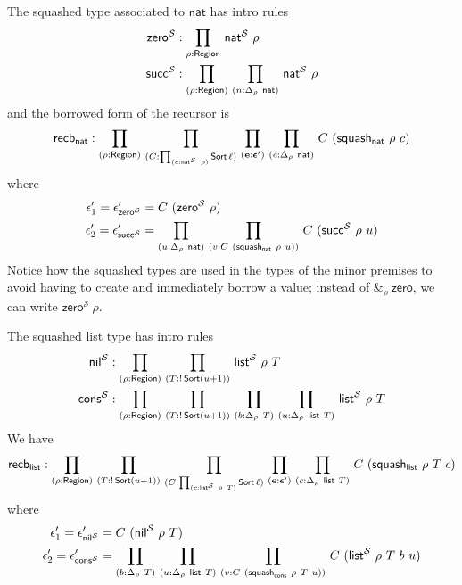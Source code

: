 \begin{eg}
	The squashed type associated to \( \mathsf{nat} \) has intro rules
	\begin{align*}
		\mathsf{zero}^{\mathcal S} &: \prd{\rho:\Region} \mathsf{nat}^{\mathcal S}\ \rho \\
		\mathsf{succ}^{\mathcal S} &: \prd{\rho:\Region}{n:\Delta_\rho\ \mathsf{nat}} \mathsf{nat}^{\mathcal S}\ \rho
	\end{align*}
	and the borrowed form of the recursor is
	\[ \mathsf{recb}_{\mathsf{nat}} : \prd{\rho:\Region}{C:\prd{c:\mathsf{nat}^{\mathcal S}\ \rho}\Sort \ell}{\vb e : \bm \epsilon'}{c:\Delta_\rho\ \mathsf{nat}}C\ (\mathsf{squash_{\mathsf{nat}}}\ \rho\ c) \]
	where
	\begin{align*}
		\epsilon_1' = \epsilon_{\mathsf{zero}^{\mathcal S}}' &= C\ (\mathsf{zero}^{\mathcal S}\ \rho) \\
		\epsilon_2' = \epsilon_{\mathsf{succ}^{\mathcal S}}' &= \prd{u:\Delta_\rho\ \mathsf{nat}}{v:C\ (\mathsf{squash_{\mathsf{nat}}}\ \rho\ u)} C\ (\mathsf{succ}^{\mathcal S}\ \rho\ u)
	\end{align*}
	Notice how the squashed types are used in the types of the minor premises to avoid having to create and immediately borrow a value; instead of \( \&_\rho\ \mathsf{zero} \), we can write \( \mathsf{zero}^{\mathcal S}\ \rho \).
\end{eg}
\begin{eg}[lists]
	The squashed list type has intro rules
	\begin{align*}
		\mathsf{nil}^{\mathcal S} &: \prd{\rho:\Region}{T:!\Sort(u+1)} \mathsf{list}^{\mathcal S}\ \rho\ T \\
		\mathsf{cons}^{\mathcal S} &: \prd{\rho:\Region}{T:!\Sort(u+1)}{b:\Delta_\rho\ T}{u:\Delta_\rho\ \mathsf{list}\ T} \mathsf{list}^{\mathcal S}\ \rho\ T
	\end{align*}
	We have
	\[ \mathsf{recb}_{\mathsf{list}} : \prd{\rho:\Region}{T:!\Sort(u+1)}{C:\prd{c:\mathsf{list}^{\mathcal S}\ \rho\ T}\Sort \ell}{\vb e : \bm \epsilon'}{c:\Delta_\rho\ \mathsf{list}\ T} C\ (\mathsf{squash_{\mathsf{list}}}\ \rho\ T\ c) \]
	where
	\begin{align*}
		\epsilon_1' = \epsilon_{\mathsf{nil}^{\mathcal S}}' &= C\ (\mathsf{nil}^{\mathcal S}\ \rho\ T) \\
		\epsilon_2' = \epsilon_{\mathsf{cons}^{\mathcal S}}' &= \prd{b:\Delta_\rho\ T}{u:\Delta_\rho\ \mathsf{list}\ T}{v:C\ (\mathsf{squash}_{\mathsf{cons}}\ \rho\ T\ u)} C\ (\mathsf{list}^{\mathcal S}\ \rho\ T\ b\ u)
	\end{align*}
\end{eg}
